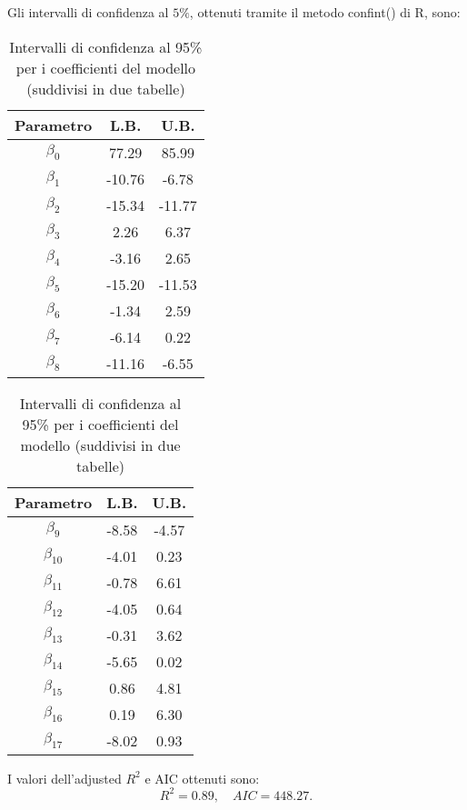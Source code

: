 Gli intervalli di confidenza al $5\%$, ottenuti tramite il metodo confint() di R, sono:
\begin{table}[H]
	\centering
	\begin{minipage}{0.48\linewidth}
		\centering
		\begin{tabular}{|c|c|c|}
			\hline
			\textbf{Parametro} & \textbf{L.B.} & \textbf{U.B.} \\
			\hline
			$\beta_0$   & 77.29  & 85.99 \\
			$\beta_1$   & -10.76 & -6.78 \\
			$\beta_2$   & -15.34 & -11.77 \\
			$\beta_3$   & 2.26   & 6.37 \\
			$\beta_4$   & -3.16  & 2.65 \\
			$\beta_5$   & -15.20 & -11.53 \\
			$\beta_6$   & -1.34  & 2.59 \\
			$\beta_7$   & -6.14  & 0.22 \\
			$\beta_8$   & -11.16 & -6.55 \\
			\hline
		\end{tabular}
	\end{minipage}
	\hfill
	\begin{minipage}{0.48\linewidth}
		\centering
		\begin{tabular}{|c|c|c|}
			\hline
			\textbf{Parametro} & \textbf{L.B.} & \textbf{U.B.} \\
			\hline
			
			$\beta_9$   & -8.58  & -4.57 \\
			$\beta_{10}$ & -4.01  & 0.23 \\
			$\beta_{11}$ & -0.78  & 6.61 \\
			$\beta_{12}$ & -4.05  & 0.64 \\
			$\beta_{13}$ & -0.31  & 3.62 \\
			$\beta_{14}$ & -5.65  & 0.02 \\
			$\beta_{15}$ & 0.86   & 4.81 \\
			$\beta_{16}$ & 0.19   & 6.30 \\
			$\beta_{17}$ & -8.02  & 0.93 \\
			\hline
		\end{tabular}
	\end{minipage}
	\caption{Intervalli di confidenza al 95\% per i coefficienti del modello (suddivisi in due tabelle)}
	\label{tab:ci_coefficienti}
\end{table}
I valori dell'adjusted $R^2$  e AIC ottenuti sono:
\begin{equation*}
	R^2 =      0.89, \quad AIC=448.27.
\end{equation*}

